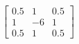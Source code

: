 \documentclass[12pt]{standalone}
\begin{document}
$\displaystyle
  \begin{bmatrix}
    0.5 & 1 & 0.5 \\
    1 & -6 & 1 \\
    0.5 & 1 & 0.5 
  \end{bmatrix}
$
\end{document}
